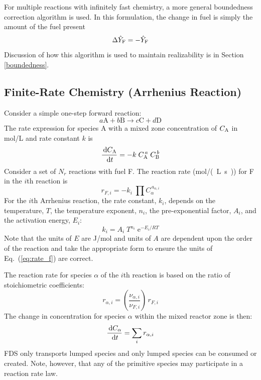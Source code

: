 For multiple reactions with infinitely fast chemistry, a more general boundedness correction algorithm is used. In this formulation, the change in fuel is simply the amount of the fuel present
\begin{equation}\label{eq:fuel_mult_reac}
\Delta \hat{Y}_{\rm F} = -\hat{Y}_{\rm F} 
\end{equation}
Discussion of how this algorithm is used to maintain realizability is in Section \ref{boundedness}.

\subsection{Finite-Rate Chemistry (Arrhenius Reaction)}
\label{Reaction_Rate_Model}

Consider a simple one-step forward reaction:
\begin{equation}\label{eq:generic_1step}
a\mathrm{A} + b\mathrm{B} \rightarrow c\mathrm{C} + d\mathrm{D}
\end{equation}
The rate expression for species A with a mixed zone concentration of $C_{\mbox{\scriptsize A}}$ in mol/L and rate constant $k$ is
\begin{equation}\label{eq:generic_rate}
\frac{\,\mathrm{d} C_{\mbox{\scriptsize A}}}{\,\mathrm{d} t}= -k\; C_{\mbox{\scriptsize A}}^{\,a}\; C_{\mbox{\scriptsize B}}^{\,b}
\end{equation}
Consider a set of $N_r$ reactions with fuel F. The reaction rate (\si{mol/(L.s)}) for F in the $i$th reaction is
\begin{equation}\label{eq:rate_f}
r_{\si{F},i}= -k_{i}\; \prod C_{\alpha}^{\,a_{\alpha,i}}
\end{equation}
For the $i$th Arrhenius reaction, the rate constant, $k_i$, depends on the temperature, $T$, the temperature exponent, $n_i$, the pre-exponential factor, $A_i$, and the activation energy, $E_i$:
\begin{equation}\label{eq:rate_cons}
k_i = A_i\;T^{n_i}\;\mathrm{e}^{-E_i/RT}
\end{equation}
Note that the units of $E$ are J/mol and units of $A$ are dependent upon the order of the reaction and take the appropriate form to ensure the units of Eq.~(\ref{eq:rate_f}) are correct.

The reaction rate for species $\alpha$ of the $i$th reaction is based on the ratio of stoichiometric coefficients:
\begin{equation}\label{eq:rate_a}
r_{\alpha,i}= \left(\frac{\nu_{\alpha,i}}{\nu_{F,i}}\right)\,r_{\si{F},i}
\end{equation}
The change in concentration for species $\alpha$ within the mixed reactor zone is then:
\begin{equation}\label{rate_expression}
\frac{\,\mathrm{d} C_{\alpha}}{\,\mathrm{d} t} = \sum_{i} r_{\alpha,i}
\end{equation}
FDS only transports lumped species and only lumped species can be consumed or created.  Note, however, that any of the primitive species may participate in a reaction rate law.

